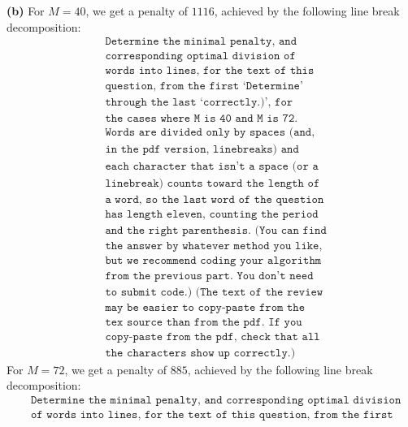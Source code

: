 \documentclass[11pt,letterpaper]{article}
\begin{document}
\begin{solution}
    \textbf{(b)} For $M=40$, we get a penalty of $1116$, achieved by the following line break decomposition:
    \begin{align*}
        &\texttt{Determine the minimal penalty, and}\\
        &\texttt{corresponding optimal division of }\\
        &\texttt{words into lines, for the text of this }\\
        &\texttt{question, from the first `Determine' }\\
        &\texttt{through the last `correctly.)', for }\\
        &\texttt{the cases where M is 40 and M is 72. }\\
        &\texttt{Words are divided only by spaces (and,} \\
        &\texttt{in the pdf version, linebreaks) and }\\
        &\texttt{each character that isn't a space (or a} \\
        &\texttt{linebreak) counts toward the length of }\\
        &\texttt{a word, so the last word of the question} \\
        &\texttt{has length eleven, counting the period }\\
        &\texttt{and the right parenthesis. (You can find} \\
        &\texttt{the answer by whatever method you like, }\\
        &\texttt{but we recommend coding your algorithm }\\
        &\texttt{from the previous part. You don't need }\\
        &\texttt{to submit code.) (The text of the review} \\
        &\texttt{may be easier to copy-paste from the }\\
        &\texttt{tex source than from the pdf. If you }\\
        &\texttt{copy-paste from the pdf, check that all}\\ 
        &\texttt{the characters show up correctly.) }
    \end{align*}
    For $M=72$, we get a penalty of $885$, achieved by the following line break decomposition:
    \begin{align*}
        &\texttt{Determine the minimal penalty, and corresponding optimal division}\\ 
        &\texttt{of words into lines, for the text of this question, from the first}\\ 

\end{align*}
\end{solution}
\end{document}
